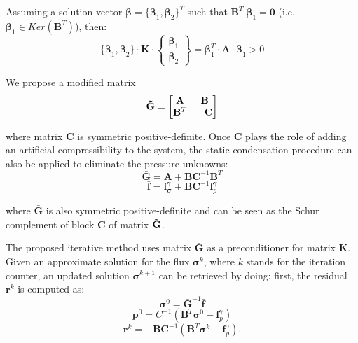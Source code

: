 \documentclass{wccm2024}
\begin{document}
Assuming a solution vector $\boldsymbol{\beta}=\{\boldsymbol{\beta}_1, \boldsymbol{\beta}_2\}^T$ such that $\mathbf{B}^T . \boldsymbol{\beta}_1 = \mathbf{0}$ (i.e. $\boldsymbol{\beta}_1 \in Ker\left( \mathbf{B}^T \right)$), then:
\vskip -0.3cm
\begin{equation}
    \{\boldsymbol{\beta}_1, \boldsymbol{\beta}_2\} \cdot \mathbf{K} \cdot 
    \begin{Bmatrix}
        \boldsymbol{\beta}_1 \\
        \boldsymbol{\beta}_2
    \end{Bmatrix}
    = \boldsymbol{\beta}_1^T \cdot \mathbf{A} \cdot \boldsymbol{\beta}_1 > 0
\end{equation}

We propose a modified matrix
\vskip -0.3cm
\begin{equation}
    \mathbf{\Tilde{G}} =
    \begin{bmatrix}
        \mathbf{A} & \mathbf{B} \\
        \mathbf{B}^T & -\mathbf{C}
    \end{bmatrix}
\end{equation}

\noindent where matrix $\mathbf{C}$ is symmetric positive-definite. Once $\mathbf{C}$ plays the role of adding an artificial compressibility to the system, the static condensation procedure can also be applied to eliminate the pressure unknowns:
\vskip -0.3cm
\begin{equation}
    \bar{\mathbf{G}} = \mathbf{A} + \mathbf{B}\mathbf{C}^{-1}\mathbf{B}^T
\end{equation}
\vskip -0.3cm
\begin{equation}
    \bar{\mathbf{f}} = \mathbf{f}^\gamma_{\boldsymbol{\sigma}} + \mathbf{B}\mathbf{C}^{-1}\mathbf{f}^\gamma_{p}
\end{equation}

\noindent where $\bar{\mathbf{G}}$ is also symmetric positive-definite and can be seen as the Schur complement of block $\mathbf{C}$ of matrix $\mathbf{\Tilde{G}}$. 

The proposed iterative method uses matrix $\bar{\mathbf{G}}$ as a preconditioner for matrix $\mathbf{K}$. Given an approximate solution for the flux $\boldsymbol{\sigma}^k$, where $k$ stands for the iteration counter, an updated solution $\boldsymbol{\sigma}^{k+1}$ can be retrieved by doing: first, the residual $\mathbf{r}^{k}$ is computed as:
\begin{equation}
\boldsymbol{\sigma}^0 = \bar{\mathbf{G}}^{-1}\bar{\mathbf{f}}
\end{equation}
\begin{equation}
\mathbf{p}^0 = C^{-1}\left(\mathbf{B}^T \boldsymbol{\sigma}^0-\mathbf{f}_p^\gamma\right)
\end{equation}
\vskip -0.3cm
\begin{equation}
    \mathbf{r}^{k} = - \mathbf{B}\mathbf{C}^{-1}\left(\mathbf{B}^T \boldsymbol{\sigma}^k-\mathbf{f}_p^\gamma \right) .
\end{equation}
\end{document}
